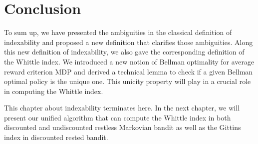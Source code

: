 \section{Conclusion}
\label{ch:idx:sec:conc}

To sum up, we have presented the ambiguities in the classical definition of indexability and proposed a new definition that clarifies those ambiguities.
Along this new definition of indexability, we also gave the corresponding definition of the Whittle index.
We introduced a new notion of Bellman optimality for average reward criterion MDP and derived a technical lemma to check if a given Bellman optimal policy is the unique one.
This unicity property will play in a crucial role in computing the Whittle index.

This chapter about indexability terminates here.
In the next chapter, we will present our unified algorithm that can compute the Whittle index in both discounted and undiscounted restless Markovian bandit as well as the Gittins index in discounted rested bandit.

\endgroup
